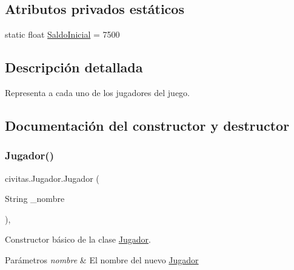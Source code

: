 \subsection*{Atributos privados estáticos}
\begin{DoxyCompactItemize}
\item 
static float \hyperlink{classcivitas_1_1Jugador_ae890734fd30e96b1fb670afa076b99dd}{Saldo\+Inicial} = 7500
\end{DoxyCompactItemize}


\subsection{Descripción detallada}
Representa a cada uno de los jugadores del juego. 

\subsection{Documentación del constructor y destructor}
\mbox{\label{classcivitas_1_1Jugador_a493ce0ae2a6589460ff693b7c53fbd1e}} 
\subsubsection{\texorpdfstring{Jugador()}{Jugador()}\hspace{0.1cm}{\footnotesize\ttfamily [1/2]}}
{\footnotesize\ttfamily civitas.\+Jugador.\+Jugador (\begin{DoxyParamCaption}\item[{String}]{\+\_\+nombre }\end{DoxyParamCaption})\hspace{0.3cm}{\ttfamily [inline]}, {\ttfamily [package]}}

Constructor básico de la clase \hyperlink{classcivitas_1_1Jugador}{Jugador}. 
\begin{DoxyParams}{Parámetros}
{\em nombre} & El nombre del nuevo \hyperlink{classcivitas_1_1Jugador}{Jugador} \\
\hline
\end{DoxyParams}
\mbox{\label{classcivitas_1_1Jugador_ab6d7fb12843896b100653b7ad9d9bab8}} 

